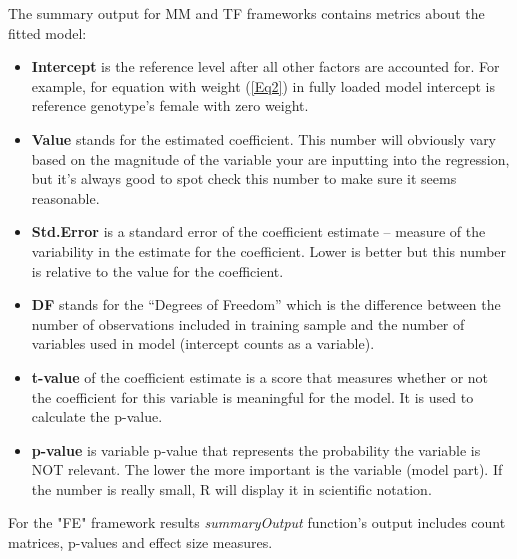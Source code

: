 \documentclass[12pt,a4paper]{article}
\begin{document}
The summary output for MM and TF frameworks contains metrics about the fitted model:
\begin{itemize}
\item \textbf{Intercept} is the reference level after all other factors are accounted for. For example, for equation with weight (\ref{Eq2}) in fully loaded model intercept is reference genotype's female with zero weight. 
 \item \textbf{Value} stands for the estimated coefficient. This number will obviously vary based on the magnitude of the variable your are inputting into the regression, but it's always good to spot check this number to make sure it seems reasonable.

\item \textbf{Std.Error} is a standard error of the coefficient estimate -- measure of the variability in the estimate for the coefficient. Lower is better but this number is relative to the value for the coefficient. 

\item \textbf{DF} stands for the ``Degrees of Freedom'' which is the difference between the number of observations included in training sample and the number of variables used in model (intercept counts as a variable).

\item \textbf{t-value} of the coefficient estimate is a score that measures whether or not the coefficient for this variable is meaningful for the model. It is used to calculate the p-value.

\item \textbf{p-value} is variable p-value that represents the probability the variable is NOT relevant. The lower the more important is the variable (model part). If the number is really small, R will display it in scientific notation.
\end{itemize}

For the "FE" framework results \textit{summaryOutput} function's output includes count matrices, p-values and effect size measures.
\end{document}
